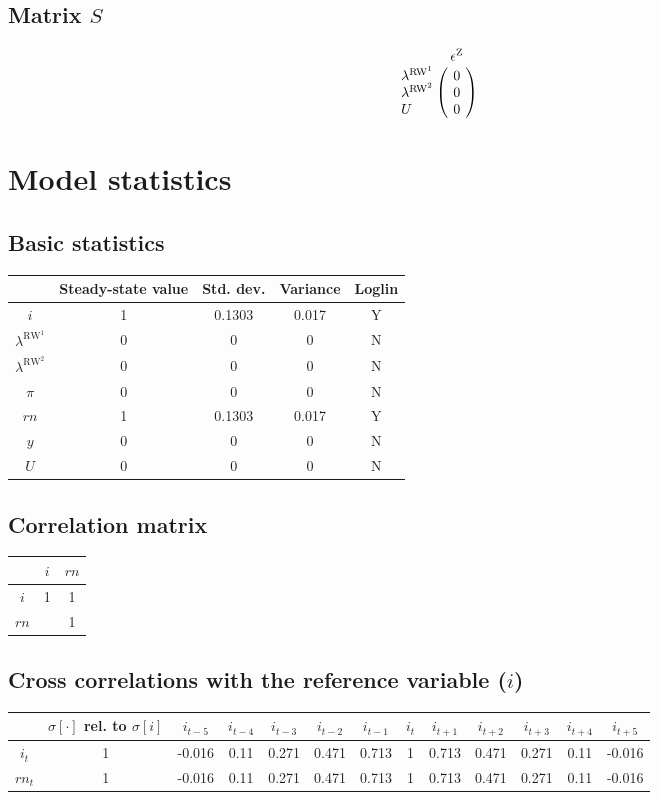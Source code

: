 \subsection*{Matrix $S$}

$$\bordermatrix{
~ & \epsilon^{\mathrm{Z}} \cr
\lambda^{\mathrm{RW}^{\mathrm{1}}} & 0 \cr
\lambda^{\mathrm{RW}^{\mathrm{2}}} & 0 \cr
U & 0 \cr
}$$


\section{Model statistics}

\subsection{Basic statistics}

\begin{tabular}{c|c|c|c|c|}
  & Steady-state value & Std. dev. & Variance & Loglin\\
\hline
$i$ & 1 & 0.1303 & 0.017 & Y    \\
$\lambda^{\mathrm{RW}^{\mathrm{1}}}$ & 0 & 0 & 0 & N    \\
$\lambda^{\mathrm{RW}^{\mathrm{2}}}$ & 0 & 0 & 0 & N    \\
$\pi$ & 0 & 0 & 0 & N    \\
${r\!n}$ & 1 & 0.1303 & 0.017 & Y    \\
$y$ & 0 & 0 & 0 & N    \\
$U$ & 0 & 0 & 0 & N    \\
\hline
\end{tabular}


\subsection{Correlation matrix}

\begin{tabular}{c|cc|}
  & $i$ & ${r\!n}$\\
\hline
$i$ & 1 & 1 \\
${r\!n}$ &  & 1 \\
\hline
\end{tabular}


\subsection{Cross correlations with the reference variable ($i$)}

\begin{tabular}{c|c|c|c|c|c|c|c|c|c|c|c|c|}
  & $\sigma[\cdot]$ rel. to $\sigma[i]$ & $i_{t-5}$ & $i_{t-4}$ & $i_{t-3}$ & $i_{t-2}$ & $i_{t-1}$ & $i_{t}$ & $i_{t+1}$ & $i_{t+2}$ & $i_{t+3}$ & $i_{t+4}$ & $i_{t+5}$\\
\hline
$i_{t}$ & 1 & -0.016 & 0.11 & 0.271 & 0.471 & 0.713 & 1 & 0.713 & 0.471 & 0.271 & 0.11 & -0.016 \\
${r\!n}_{t}$ & 1 & -0.016 & 0.11 & 0.271 & 0.471 & 0.713 & 1 & 0.713 & 0.471 & 0.271 & 0.11 & -0.016 \\
\hline
\end{tabular}


